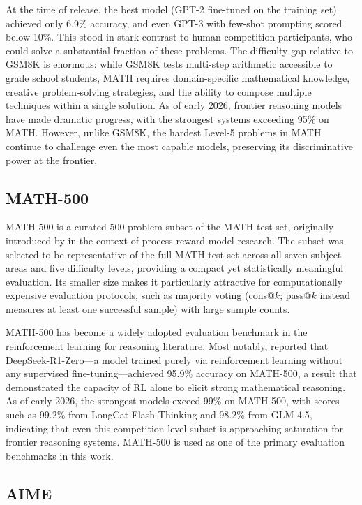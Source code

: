 At the time of release, the best model (GPT-2 fine-tuned on the training set) achieved only 6.9\% accuracy, and even GPT-3 with few-shot prompting scored below 10\%. This stood in stark contrast to human competition participants, who could solve a substantial fraction of these problems. The difficulty gap relative to GSM8K is enormous: while GSM8K tests multi-step arithmetic accessible to grade school students, MATH requires domain-specific mathematical knowledge, creative problem-solving strategies, and the ability to compose multiple techniques within a single solution. As of early 2026, frontier reasoning models have made dramatic progress, with the strongest systems exceeding 95\% on MATH. However, unlike GSM8K, the hardest Level-5 problems in MATH continue to challenge even the most capable models, preserving its discriminative power at the frontier.

\subsection{MATH-500}

MATH-500 is a curated 500-problem subset of the MATH test set, originally introduced by \cite{lightman2023lets} in the context of process reward model research. The subset was selected to be representative of the full MATH test set across all seven subject areas and five difficulty levels, providing a compact yet statistically meaningful evaluation. Its smaller size makes it particularly attractive for computationally expensive evaluation protocols, such as majority voting (cons@$k$; pass@$k$ instead measures at least one successful sample) with large sample counts.

MATH-500 has become a widely adopted evaluation benchmark in the reinforcement learning for reasoning literature. Most notably, \cite{deepseek2025r1} reported that DeepSeek-R1-Zero---a model trained purely via reinforcement learning without any supervised fine-tuning---achieved 95.9\% accuracy on MATH-500, a result that demonstrated the capacity of RL alone to elicit strong mathematical reasoning. As of early 2026, the strongest models exceed 99\% on MATH-500, with scores such as 99.2\% from LongCat-Flash-Thinking and 98.2\% from GLM-4.5, indicating that even this competition-level subset is approaching saturation for frontier reasoning systems. MATH-500 is used as one of the primary evaluation benchmarks in this work.

\subsection{AIME}

